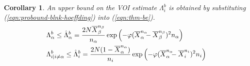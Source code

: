 \documentclass[]{article}
\newtheorem{crl}[thm]{Corollary}
\begin{document}

\begin{crl}
An upper bound on the VOI estimate $\Lambda_i^b$ is obtained
by substituting (\ref{eqn:probound-blnk-hoeffding}) into (\ref{eqn:thm-be}).
\begin{align}
  \label{eqn:bound-blnk-hoeffding}
  \Lambda&_\alpha^b \le \hat\Lambda_\alpha^b=\frac {2N\overline X_\beta^{n_\beta}} {n_\alpha}\exp\left(- \varphi(\overline X_\alpha^{n_\alpha}\hspace{-0.5em} - \overline X_\beta^{n_\beta})^2 n_\alpha\right)\nonumber\\
  \Lambda&_{i|i\ne\alpha}^b\le \hat\Lambda_i^b=  \frac {2N(1-\overline  X_\alpha^{n_\alpha})} {n_i}\exp\left(- \varphi(\overline X_\alpha^{n_\alpha}\hspace{-0.5em} - \overline X_i^{n_i})^2 n_i\right)
\end{align}
\label{crl:bound-blnk-hoeffding}
\end{crl}
\vspace{-2em}
\end{document}
